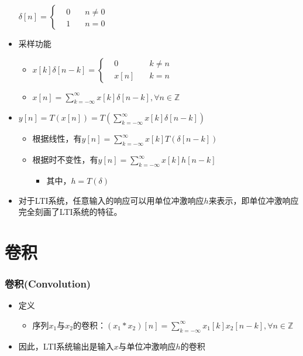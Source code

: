\documentclass[CJKutf8,xcolor=pdftex,dvipsnames,table]{beamer}
\begin{document}
\begin{CJK*}{UTF8}{song}
\begin{frame}
\begin{itemize}
    \begin{math}
\delta[n] = 
\left\{
    \begin {aligned}
         & 0 \quad & n \neq 0 \\
         & 1 \quad & n = 0                  
    \end{aligned}
\right.
	\end{math}    
 
    \item 采样功能
        \begin{itemize}
        \item 
    \begin{math}
x[k]\delta[n-k] = 
\left\{
    \begin {aligned}
         & 0 \quad & k \neq n \\
         & x[n] \quad & k = n                  
    \end{aligned}
\right.
	\end{math}     
        \item $x[n]=\sum_{k=-\infty}^{\infty}x[k]\delta[n-k], \forall n \in \mathbb{Z}$
        \end{itemize} 
        
    \item $y[n]=T(x[n])=T(\sum_{k=-\infty}^{\infty}x[k]\delta[n-k])$
        \begin{itemize}
        \item 根据线性，有$y[n]=\sum_{k=-\infty}^{\infty}x[k]T(\delta[n-k])$
        \item 根据时不变性，有$y[n]=\sum_{k=-\infty}^{\infty}x[k]h[n-k]$
            \begin{itemize}
            \item 其中，$h=T(\delta)$
            \end{itemize}
        \end{itemize}
    \item 对于LTI系统，任意输入的响应可以用单位冲激响应$h$来表示，即单位冲激响应完全刻画了LTI系统的特征。
    \end{itemize} 
  \end{frame}    
    

  \section{卷积}
      
  \begin{frame}
    \frametitle{卷积(Convolution)}
    \begin{itemize}
    \item 定义
        \begin{itemize}
        \item 序列$x_1$与$x_2$的卷积：$(x_1*x_2)[n]=\sum_{k=-\infty}^{\infty}x_1[k]x_2[n-k], \forall n \in \mathbb{Z}$
        \end{itemize}   
    \item 因此，LTI系统输出是输入$x$与单位冲激响应$h$的卷积
    \end{itemize} 
  \end{frame}     
    
\end{CJK*}
\end{document}
